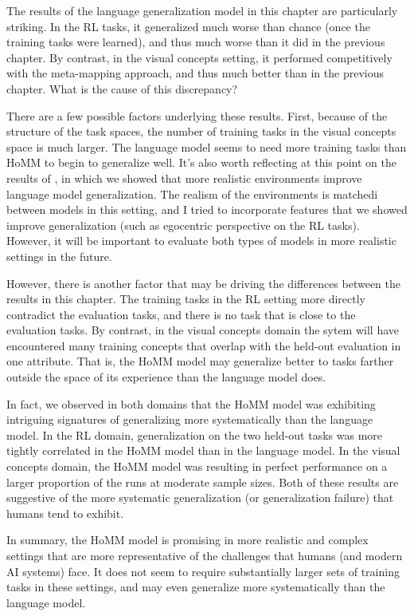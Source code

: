The results of the language generalization model in this chapter are particularly striking. In the RL tasks, it generalized much worse than chance (once the training tasks were learned), and thus much worse than it did in the previous chapter. By contrast, in the visual concepts setting, it performed competitively with the meta-mapping approach, and thus much better than in the previous chapter. What is the cause of this discrepancy? \par 

There are a few possible factors underlying these results. First, because of the structure of the task spaces, the number of training tasks in the visual concepts space is much larger. The language model seems to need more training tasks than HoMM to begin to generalize well. It's also worth reflecting at this point on the results of \citet{Hill2019a}, in which we showed that more realistic environments improve language model generalization. The realism of the environments is matchedi between models in this setting, and I tried to incorporate features that we showed improve generalization (such as egocentric perspective on the RL tasks). However, it will be important to evaluate both types of models in more realistic settings in the future. \par

However, there is another factor that may be driving the differences between the results in this chapter. The training tasks in the RL setting more directly contradict the evaluation tasks, and there is no task that is close to the evaluation tasks. By contrast, in the visual concepts domain the sytem will have encountered many training concepts that overlap with the held-out evaluation in one attribute. That is, the HoMM model may generalize better to tasks farther outside the space of its experience than the language model does. \par  

In fact, we observed in both domains that the HoMM model was exhibiting intriguing signatures of generalizing more systematically than the language model. In the RL domain, generalization on the two held-out tasks was more tightly correlated in the HoMM model than in the language model. In the visual concepts domain, the HoMM model was resulting in perfect performance on a larger proportion of the runs at moderate sample sizes. Both of these results are suggestive of the more systematic generalization (or generalization failure) that humans tend to exhibit. \par

In summary, the HoMM model is promising in more realistic and complex settings that are more representative of the challenges that humans (and modern AI systems) face. It does not seem to require substantially larger sets of training tasks in these settings, and may even generalize more systematically than the language model. 



